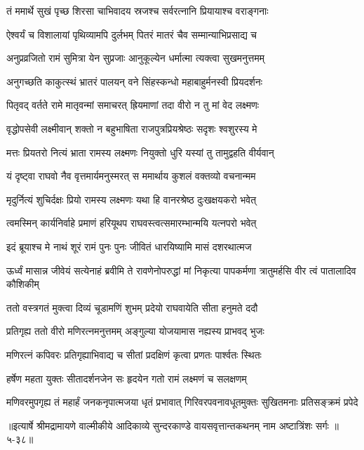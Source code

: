 \twolineshloka
{तं ममार्थे सुखं पृच्छ शिरसा चाभिवादय}
{स्रजश्च सर्वरत्नानि प्रियायाश्च वराङ्गनाः} %

\twolineshloka
{ऐश्वर्यं च विशालायां पृथिव्यामपि दुर्लभम्}
{पितरं मातरं चैव सम्मान्याभिप्रसाद्य च} %

\twolineshloka
{अनुप्रव्रजितो रामं सुमित्रा येन सुप्रजाः}
{आनुकूल्येन धर्मात्मा त्यक्त्वा सुखमनुत्तमम्} %

\twolineshloka
{अनुगच्छति काकुत्स्थं भ्रातरं पालयन् वने}
{सिंहस्कन्धो महाबाहुर्मनस्वी प्रियदर्शनः} %

\twolineshloka
{पितृवद् वर्तते रामे मातृवन्मां समाचरत्}
{ह्रियमाणां तदा वीरो न तु मां वेद लक्ष्मणः} %

\twolineshloka
{वृद्धोपसेवी लक्ष्मीवान् शक्तो न बहुभाषिता}
{राजपुत्रप्रियश्रेष्ठः सदृशः श्वशुरस्य मे} %

\twolineshloka
{मत्तः प्रियतरो नित्यं भ्राता रामस्य लक्ष्मणः}
{नियुक्तो धुरि यस्यां तु तामुद्वहति वीर्यवान्} %

\twolineshloka
{यं दृष्ट्वा राघवो नैव वृत्तमार्यमनुस्मरत्}
{स ममार्थाय कुशलं वक्तव्यो वचनान्मम} %

\twolineshloka
{मृदुर्नित्यं शुचिर्दक्षः प्रियो रामस्य लक्ष्मणः}
{यथा हि वानरश्रेष्ठ दुःखक्षयकरो भवेत्} %

\twolineshloka
{त्वमस्मिन् कार्यनिर्वाहे प्रमाणं हरियूथप}
{राघवस्त्वत्समारम्भान्मयि यत्नपरो भवेत्} %

\twolineshloka
{इदं ब्रूयाश्च मे नाथं शूरं रामं पुनः पुनः}
{जीवितं धारयिष्यामि मासं दशरथात्मज} %

\threelineshloka
{ऊर्ध्वं मासान्न जीवेयं सत्येनाहं ब्रवीमि ते}
{रावणेनोपरुद्धां मां निकृत्या पापकर्मणा}
{त्रातुमर्हसि वीर त्वं पातालादिव कौशिकीम्} %

\twolineshloka
{ततो वस्त्रगतं मुक्त्वा दिव्यं चूडामणिं शुभम्}
{प्रदेयो राघवायेति सीता हनुमते ददौ} %

\twolineshloka
{प्रतिगृह्य ततो वीरो मणिरत्नमनुत्तमम्}
{अङ्गुल्या योजयामास नह्यस्य प्राभवद् भुजः} %

\twolineshloka
{मणिरत्नं कपिवरः प्रतिगृह्याभिवाद्य च}
{सीतां प्रदक्षिणं कृत्वा प्रणतः पार्श्वतः स्थितः} %

\twolineshloka
{हर्षेण महता युक्तः सीतादर्शनजेन सः}
{हृदयेन गतो रामं लक्ष्मणं च सलक्षणम्} %

\twolineshloka
{मणिवरमुपगृह्य तं महार्हं जनकनृपात्मजया धृतं प्रभावात्}
{गिरिवरपवनावधूतमुक्तः सुखितमनाः प्रतिसङ्क्रमं प्रपेदे} %


॥इत्यार्षे श्रीमद्रामायणे वाल्मीकीये आदिकाव्ये सुन्दरकाण्डे वायसवृत्तान्तकथनम् नाम अष्टात्रिंशः सर्गः ॥५-३८॥
